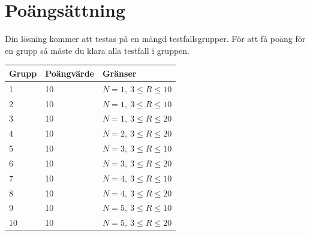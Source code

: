 \section*{Poängsättning}
Din lösning kommer att testas på en mängd testfallsgrupper. För att få poäng för en grupp
så måste du klara alla testfall i gruppen.

\begin{tabular}{| l | l | l |}
\hline
Grupp & Poängvärde & Gränser \\ \hline
1     & 10         & $N=1,\ 3 \le R \le 10$ \\ 
2     & 10         & $N=1,\ 3 \le R \le 10$ \\ 
3     & 10         & $N=1,\ 3 \le R \le 20$ \\ 
4     & 10         & $N=2,\ 3 \le R \le 20$ \\ 
5     & 10         & $N=3,\ 3 \le R \le 10$ \\ 
6     & 10         & $N=3,\ 3 \le R \le 20$ \\ 
7     & 10         & $N=4,\ 3 \le R \le 10$ \\ 
8     & 10         & $N=4,\ 3 \le R \le 20$ \\ 
9     & 10         & $N=5,\ 3 \le R \le 10$ \\ 
10    & 10         & $N=5,\ 3 \le R \le 20$ \\ \hline
\end{tabular}

